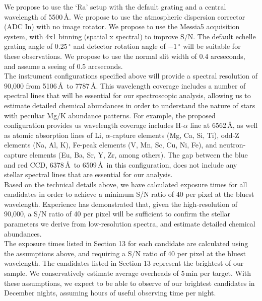 \documentclass{article}
\begin{document}
\begin{technicalinfo}
We propose to use the `Ra' setup with the default grating and a central wavelength of 5500\,\AA. We propose to use the atmospheric dispersion corrector (ADC In) with no image rotator. We propose to use the Messia5 acquisition system, with 4x1 binning (spatial x spectral) to improve S/N. The default echelle grating angle of 0.25\,$^\circ$ and detector rotation angle of $-1$\,$^\circ$ will be suitable for these observations. We propose to use the normal slit width of 0.4 arcseconds, and assume a seeing of 0.5 arcseconds.\\
 
The instrument configurations specified above will provide a spectral resolution of 90,000 from 5106\,\AA\ to 7787\,\AA. This wavelength coverage includes a number of spectral lines that will be essential for our spectroscopic analysis, allowing us to estimate detailed chemical abundances in order to understand the nature of stars with peculiar Mg/K abundance patterns. For example, the proposed configuration provides us wavelength coverage includes H-$\alpha$ line at 6562\,\AA, as well as atomic absorption lines of Li, $\alpha$-capture elements (Mg, Ca, Si, Ti), odd-Z elements (Na, Al, K), Fe-peak elements (V, Mn, Sc, Cu, Ni, Fe), and neutron-capture elements (Eu, Ba, Sr, Y, Zr, among others). The gap between the blue and red CCD, 6378\,\AA\ to 6509\,\AA\ in this configuration, does not include any stellar spectral lines that are essential for our analysis. \\

Based on the technical details above, we have calculated exposure times for all candidates in order to achieve a minimum S/N ratio of 40 per pixel at the bluest wavelength. Experience has demonstrated that, given the high-resolution of 90,000, a S/N ratio of 40 per pixel will be sufficient to confirm the stellar parameters we derive from low-resolution spectra, and estimate detailed chemical abundances.\\

The exposure times listed in Section 13 for each candidate are calculated using the assumptions above, and requiring a S/N ratio of 40 per pixel at  the bluest wavelength. The candidates listed in Section 13 represent the brightest of our sample. We conservatively estimate average overheads of 5\,min per target. With these assumptions, we expect to be able to observe  of our brightest candidates in  December nights, assuming  hours of useful observing time per night.\\


\end{technicalinfo}
\end{document}
